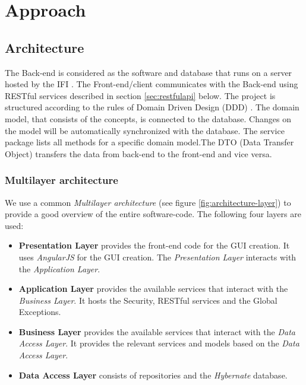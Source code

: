 \chapter{Approach}

\section{Architecture}

The Back-end is considered as the software and database that runs on a server hosted by the IFI \cite{ifi}. The Front-end/client communicates with the Back-end using RESTful services described in section \ref{sec:restfulapi} below.\newline
The project is structured according to the rules of Domain Driven Design (DDD) \cite{ddd}. The domain model, that consists of the concepts, is connected to the database. Changes on the model will be automatically synchronized with the database. The service package lists all methods for a specific domain model.\newline The DTO (Data Transfer Object) transfers the data from back-end to the front-end and vice versa.

\subsection{Multilayer architecture}
We use a common \textit{Multilayer architecture} (see figure \ref{fig:architecture-layer}) to provide a good overview of the entire software-code. The following four layers are used:
\begin{itemize}
    \item \textbf{Presentation Layer} provides the front-end code for the GUI creation. It uses \textit{AngularJS} for the GUI creation. The \textit{Presentation Layer} interacts with the \textit{Application Layer}.
    \item \textbf{Application Layer} provides the available services that interact with the \textit{Business Layer}. It hosts the Security, RESTful services and the Global Exceptions.
    \item \textbf{Business Layer} provides the available services that interact with the \textit{Data Access Layer}. It provides the relevant services and models based on the \textit{Data Access Layer}.
    \item \textbf{Data Access Layer} consists of repositories and the \textit{Hybernate} database. 
\end{itemize}

